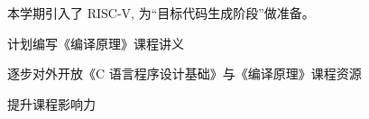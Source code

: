 \begin{frame}{}
  \begin{center}

    \vspace{0.30cm}
    本学期引入了 RISC-V, 为``目标代码生成阶段''做准备。
  \end{center}
\end{frame}

\begin{frame}{}
  \begin{center}
    计划编写《编译原理》课程讲义

    \vspace{0.80cm}
    逐步对外开放《C 语言程序设计基础》与《编译原理》课程资源

    \vspace{0.30cm}
    提升课程影响力
  \end{center}
\end{frame}
